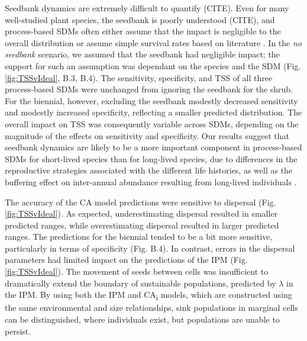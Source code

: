 \documentclass[preprint,review,times,12pt]{elsarticle}
\begin{document}
Seedbank dynamics are extremely difficult to quantify (CITE). Even for many well-studied plant species, the seedbank is poorly understood (CITE), and process-based SDMs often either assume that the impact is negligible to the overall distribution \citep{Merow2017} or assume simple survival rates based on literature \citep{Szewczyk2019}. In the \emph{no seedbank} scenario, we assumed that the seedbank had negligible impact; the support for such an assumption was dependant on the species and the SDM (Fig. \ref{fig:TSSvIdeal}, B.3, B.4). The sensitivity, specificity, and TSS of all three process-based SDMs were unchanged from ignoring the seedbank for the shrub. For the biennial, however, excluding the seedbank modestly decreased sensitivity and modestly increased specificity, reflecting a smaller predicted distribution. The overall impact on TSS was consequently variable across SDMs, depending on the magnitude of the effects on sensitivity and specificity. Our results suggest that seedbank dynamics are likely to be a more important component in process-based SDMs for short-lived species than for long-lived species, due to differences in the reproductive strategies associated with the different life histories, as well as the buffering effect on inter-annual abundance resulting from long-lived individuals \citep{Morris2003}.

The accuracy of the CA model predictions were sensitive to dispersal (Fig. \ref{fig:TSSvIdeal}). As expected, underestimating dispersal resulted in smaller predicted ranges, while overestimating dispersal resulted in larger predicted ranges. The predictions for the biennial tended to be a bit more sensitive, particularly in terms of specificity (Fig. B.4). In contrast, errors in the dispersal parameters had limited impact on the predictions of the IPM (Fig. \ref{fig:TSSvIdeal}). The movement of seeds between cells was insufficient to dramatically extend the boundary of sustainable populations, predicted by $\lambda$ in the IPM. By using both the IPM and CA\textsubscript{i} models, which are constructed using the same environmental and size relationships, sink populations in marginal cells can be distinguished, where individuals exist, but populations are unable to persist.
\end{document}
